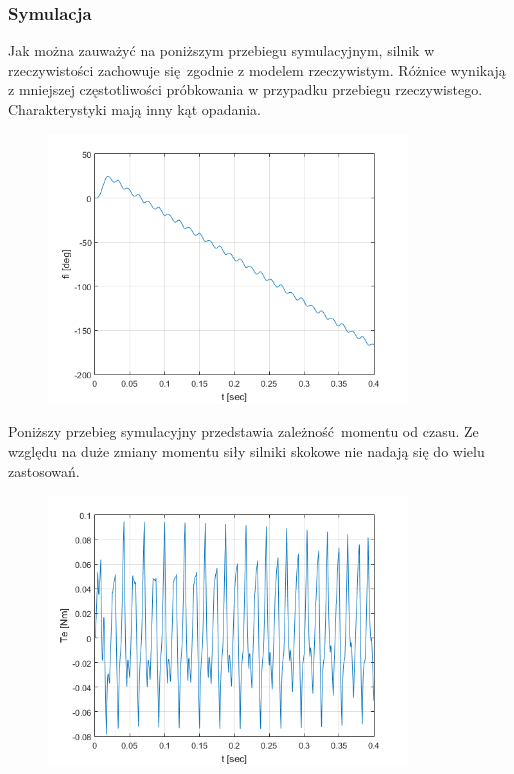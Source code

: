 \documentclass[a4paper, 12pt]{article}
\begin{document}
			\subsubsection{Symulacja}
				Jak można zauważyć na poniższym przebiegu symulacyjnym, silnik w rzeczywistości zachowuje się zgodnie z modelem rzeczywistym. Różnice wynikają z mniejszej częstotliwości próbkowania w przypadku przebiegu rzeczywistego. Charakterystyki mają inny kąt opadania.
				\begin{figure}[H]
					\centering
					\includegraphics[width = 0.85\textwidth]{./symulacyjne/kat_od_czasu.png}
				\end{figure} \noindent
				Poniższy przebieg symulacyjny przedstawia zależność momentu od czasu. Ze względu na duże zmiany momentu siły silniki skokowe nie nadają się do wielu zastosowań.
				\begin{figure}[H]
					\centering
					\includegraphics[width = 0.85\textwidth]{./symulacyjne/moment_od_czasu.png}
				\end{figure} \noindent
\end{document}

